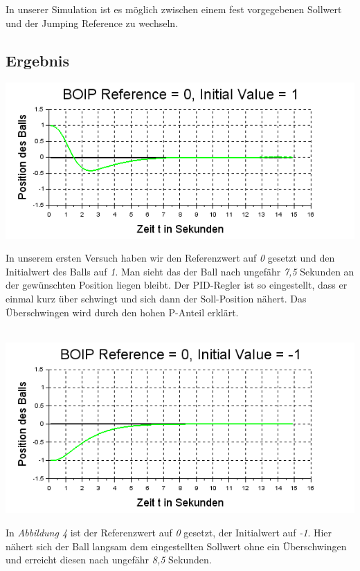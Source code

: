 In unserer Simulation ist es möglich zwischen einem fest vorgegebenen Sollwert und der Jumping Reference zu wechseln.

\subsection{Ergebnis}

\begin{center}
	\begin{minipage}{\linewidth}
	\centering
	\includegraphics[scale=0.7]{images/ref0_init1.png}
	\end{minipage}
\end{center}
In unserem ersten Versuch haben wir den Referenzwert auf \textit{0} gesetzt und den Initialwert des Balls auf \textit{1}. Man sieht das der Ball nach ungefähr \textit{7,5} Sekunden an der gewünschten Position liegen bleibt. Der PID-Regler ist so eingestellt, dass er einmal kurz über schwingt und sich dann der Soll-Position nähert. Das Überschwingen wird durch den hohen P-Anteil erklärt.\\ \\

\begin{center}
	\begin{minipage}{\linewidth}
	\centering
	\includegraphics[scale=0.7]{images/ref0_init-1.png}
	\end{minipage}
\end{center}
In \textit{Abbildung 4} ist der Referenzwert auf \textit{0} gesetzt, der Initialwert auf \textit{-1}. Hier nähert sich der Ball langsam dem eingestellten Sollwert ohne ein Überschwingen und erreicht diesen nach ungefähr \textit{8,5} Sekunden. \\ \\

